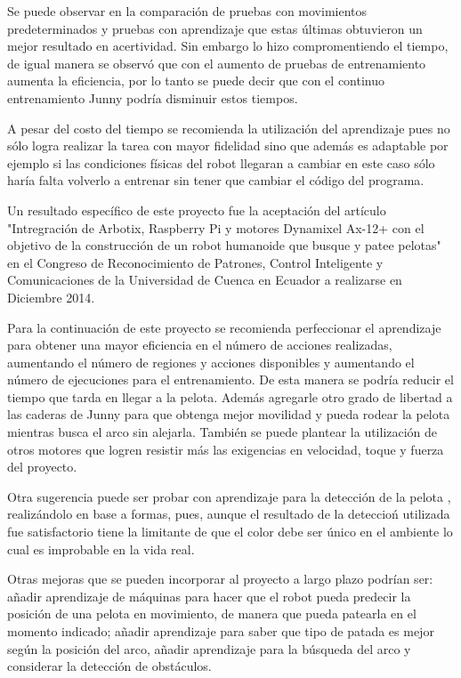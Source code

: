 Se puede observar en la comparaci\'on de pruebas con movimientos predeterminados y pruebas con aprendizaje que estas \'ultimas obtuvieron un mejor resultado en acertividad. Sin embargo  lo hizo compromentiendo el tiempo, de igual manera se observ\'o que con el aumento de pruebas de entrenamiento aumenta la eficiencia, por lo tanto se puede decir que con el continuo entrenamiento Junny podr\'ia disminuir estos tiempos. 

A pesar del costo del tiempo se recomienda la utilizaci\'on del aprendizaje pues no s\'olo logra realizar la tarea con mayor fidelidad sino que adem\'as es adaptable por ejemplo si las condiciones f\'isicas del robot llegaran a cambiar en este caso s\'olo haría falta volverlo a entrenar sin tener que cambiar el código del programa.

Un resultado espec\'ifico de este proyecto fue la aceptaci\'on del art\'iculo "Intregraci\'on de Arbotix, Raspberry Pi y motores Dynamixel Ax-12+ con el objetivo de la construcción de un robot humanoide que busque  y patee pelotas" \cite{junny} en el Congreso de Reconocimiento de Patrones, Control Inteligente y Comunicaciones de la Universidad de Cuenca en Ecuador a realizarse en Diciembre 2014.

Para la continuaci\'on de este proyecto se recomienda perfeccionar el aprendizaje para obtener una mayor eficiencia en el n\'umero de acciones realizadas, aumentando el número de regiones y acciones disponibles y aumentando el número de ejecuciones para el entrenamiento. De esta manera se podría reducir el tiempo que tarda en llegar a la pelota. Además agregarle otro grado de libertad a las 
caderas de Junny para que obtenga mejor movilidad y pueda rodear la pelota mientras busca el arco sin alejarla. Tambi\'en se puede plantear la utilizaci\'on de otros motores que logren resistir m\'as las exigencias en velocidad, toque y fuerza del proyecto.

Otra sugerencia puede ser probar con aprendizaje para la detecci\'on de la pelota , realiz\'andolo en base a formas, pues, aunque el resultado de la deteccio\'n utilizada fue satisfactorio tiene la limitante de que el color debe ser \'unico en el ambiente lo cual es improbable en la vida real.  

Otras mejoras que se pueden incorporar al proyecto a largo plazo podrían ser: añadir aprendizaje de m\'aquinas para hacer que el robot pueda predecir la posición de una pelota en movimiento, de manera que pueda patearla en el momento indicado; a\~nadir aprendizaje para saber que tipo de patada es mejor seg\'un la posición del arco, a\~nadir aprendizaje para la búsqueda del arco y considerar la detecci\'on de obst\'aculos.

